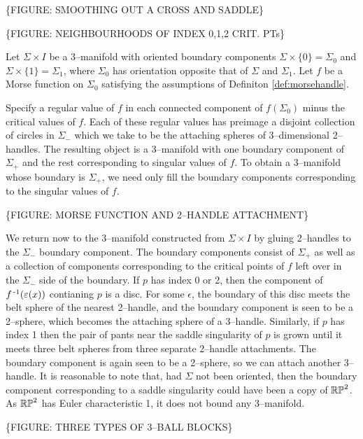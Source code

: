 \{FIGURE: SMOOTHING OUT A CROSS AND SADDLE\}

\{FIGURE: NEIGHBOURHOODS OF INDEX 0,1,2 CRIT. PTs\}

Let $\Sigma\times I$ be a 3--manifold with oriented boundary components $\Sigma\times\{0\}=\Sigma_0$ and $\Sigma\times\{1\}=\Sigma_1$, where $\Sigma_0$ has orientation opposite that of $\Sigma$ and $\Sigma_1$.
Let $f$ be a Morse function on $\Sigma_0$ satisfying the assumptions of Definiton \ref{def:morsehandle}.


 Specify a regular value of $f$ in each connected component of $f(\Sigma_0)$ minus the critical values of $f$.
Each of these regular values has preimage a disjoint collection of circles in $\Sigma_-$ which we take to be the attaching spheres of 3--dimensional 2--handles. 
The resulting object is a 3--manifold with one boundary component of $\Sigma_+$ and the rest corresponding to singular values of $f$.
To obtain a 3--manifold whose boundary is $\Sigma_+$, we need only fill the boundary components corresponding to the singular values of $f$.

\{FIGURE: MORSE FUNCTION AND 2--HANDLE ATTACHMENT\}



We return now to the 3--manifold constructed from $\Sigma\times I$ by gluing 2--handles to the $\Sigma_-$ boundary component.
The boundary components consist of $\Sigma_+$ as well as a collection of components corresponding to the critical points of $f$ left over in the $\Sigma_-$ side of the boundary.
If $p$ has index 0 or 2, then the component of $f^{\,\text{-}1}(\varepsilon(x))$ contianing $p$ is a disc.
For some $\epsilon$, the boundary of this disc meets the belt sphere of the nearest 2--handle, and the boundary component is seen to be a 2--sphere, which becomes the attaching sphere of a 3--handle.
Similarly, if $p$ has index 1 then the pair of pants near the saddle singularity of $p$ is grown until it meets three belt spheres from three separate 2--handle attachments.
The boundary component is again seen to be a 2--sphere, so we can attach another 3--handle.
It is reasonable to note that, had $\Sigma$ not been oriented, then the boundary component corresponding to a saddle singularity could have been a copy of $\mathbb{RP}^2$.
As $\mathbb{RP}^2$ has Euler characteristic 1, it does not bound any 3--manifold.

\{FIGURE: THREE TYPES OF 3--BALL BLOCKS\}

